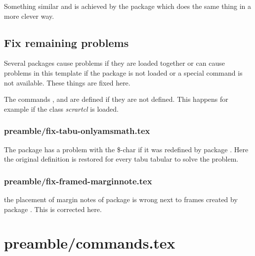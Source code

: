 Something similar and is achieved by the package  which does the same thing in a more clever way.


\subsection{Fix remaining problems}

Several packages cause problems if they are loaded together or can cause problems in this template if the package is not loaded or a special command is not available. These things are fixed here.

The commands ,  and  are defined if they are not defined. This happens for example if the class \emph{scrartcl} is loaded.


\subsubsection{preamble/fix-tabu-onlyamsmath.tex}

The package  has a problem with the \$-char if it was redefined by package . Here the original definition is restored for every tabu tabular to solve the problem.


\subsubsection{preamble/fix-framed-marginnote.tex}

the placement of margin notes of package  is wrong next to frames created by package . This is corrected here.



\section{preamble/commands.tex}

